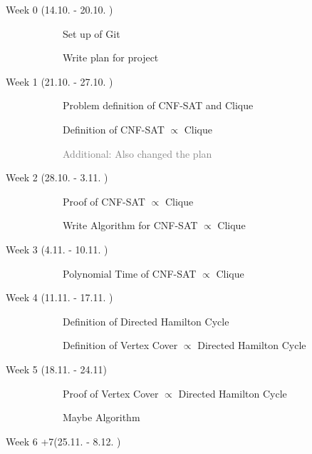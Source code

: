 \documentclass[11pt,a4paper]{scrartcl}
\begin{document}
	\begin{description}
		\item[Week 0 (14.10. - 20.10. )] \hfill
		\begin{description}
			\item[\textcolor{Green}{\CheckedBox}] Set up of Git
			\item[\textcolor{Green}{\CheckedBox}] Write plan for project 
		\end{description}
		\item[ Week 1 (21.10. - 27.10. )] \hfill 
		\begin{description}
			\item[\textcolor{Green}{\CheckedBox}] Problem definition of CNF-SAT and Clique
			\item[\textcolor{Green}{\CheckedBox}] Definition of CNF-SAT $\varpropto$ Clique
			\item[] \textcolor{gray}{Additional: Also changed the plan}
		\end{description}
		\item[Week 2 (28.10. - 3.11. )] \hfill
		\begin{description}
			\item[\textcolor{Green}{\CheckedBox}]Proof of CNF-SAT $\varpropto$ Clique
			\item[\textcolor{Green}{\CheckedBox}] Write Algorithm for CNF-SAT $\varpropto$ Clique
			\end{description}
		\item[Week 3 (4.11. - 10.11. )]\hfill \begin{description}
			\item[\Square] Polynomial Time of CNF-SAT $\varpropto$ Clique
		\end{description} 
		\item[Week 4 (11.11. - 17.11. )] \hfill
		\begin{description}
			\item[\Square] Definition of  Directed Hamilton Cycle
			\item[\Square] Definition of Vertex Cover $\varpropto$ Directed Hamilton Cycle
		\end{description} 
		\item[Week 5 (18.11. - 24.11)] \hfill
		\begin{description}
			\item[\Square] Proof of Vertex Cover $\varpropto$ Directed Hamilton Cycle
			\item[\Square] Maybe Algorithm
		\end{description}
		\item[Week 6 +7(25.11. - 8.12. )] \hfill

\end{description}
\end{document}
